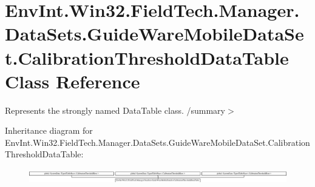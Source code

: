 \hypertarget{class_env_int_1_1_win32_1_1_field_tech_1_1_manager_1_1_data_sets_1_1_guide_ware_mobile_data_set_e4a98fb4b531becb042ae997c9d8a15c}{}\section{Env\+Int.\+Win32.\+Field\+Tech.\+Manager.\+Data\+Sets.\+Guide\+Ware\+Mobile\+Data\+Set.\+Calibration\+Threshold\+Data\+Table Class Reference}
\label{class_env_int_1_1_win32_1_1_field_tech_1_1_manager_1_1_data_sets_1_1_guide_ware_mobile_data_set_e4a98fb4b531becb042ae997c9d8a15c}


Represents the strongly named Data\+Table class. /summary$>$  


Inheritance diagram for Env\+Int.\+Win32.\+Field\+Tech.\+Manager.\+Data\+Sets.\+Guide\+Ware\+Mobile\+Data\+Set.\+Calibration\+Threshold\+Data\+Table\+:\begin{figure}[H]
\begin{center}
\leavevmode
\includegraphics[height=0.632768cm]{class_env_int_1_1_win32_1_1_field_tech_1_1_manager_1_1_data_sets_1_1_guide_ware_mobile_data_set_e4a98fb4b531becb042ae997c9d8a15c}
\end{center}
\end{figure}
